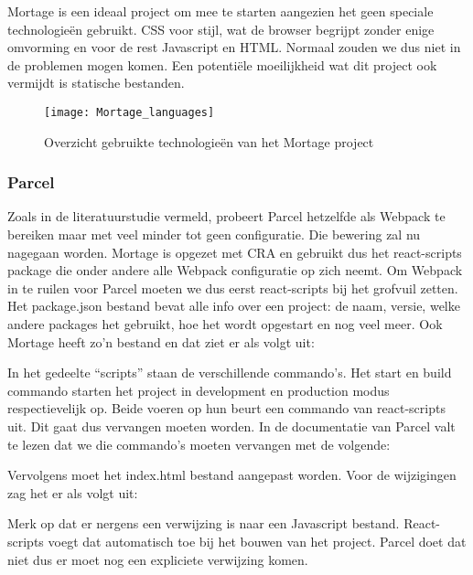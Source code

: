 Mortage is een ideaal project om mee te starten aangezien het geen speciale technologieën gebruikt. CSS voor stijl, wat de browser begrijpt zonder enige omvorming en voor de rest Javascript en HTML. Normaal zouden we dus niet in de problemen mogen komen. Een potentiële moeilijkheid wat dit project ook vermijdt is statische bestanden. 

\begin{figure}[h]
    \texttt{[image: Mortage\_languages]}
        \centering
        \caption{Overzicht gebruikte technologieën van het Mortage project}
    \end{figure}

\subsubsection{Parcel}
Zoals in de literatuurstudie vermeld, probeert Parcel hetzelfde als Webpack te bereiken maar met veel minder tot geen configuratie. Die bewering zal nu nagegaan worden. Mortage is opgezet met CRA en gebruikt dus het react-scripts package die onder andere alle Webpack configuratie op zich neemt. Om Webpack in te ruilen voor Parcel moeten we dus eerst react-scripts bij het grofvuil zetten. Het package.json bestand bevat alle info over een project: de naam, versie, welke andere packages het gebruikt, hoe het wordt opgestart en nog veel meer. Ook Mortage heeft zo’n bestand en dat ziet er als volgt uit:



In het gedeelte “scripts” staan de verschillende commando’s. Het start en build commando starten het project in development en production modus respectievelijk op. Beide voeren op hun beurt een commando van react-scripts uit. Dit gaat dus vervangen moeten worden. In de documentatie van Parcel valt te lezen dat we die commando’s moeten vervangen met de volgende:



Vervolgens moet het index.html bestand aangepast worden. Voor de wijzigingen zag het er als volgt uit:



Merk op dat er nergens een verwijzing is naar een Javascript bestand. React-scripts voegt dat automatisch toe bij het bouwen van het project. Parcel doet dat niet dus er moet nog een expliciete verwijzing komen. 

